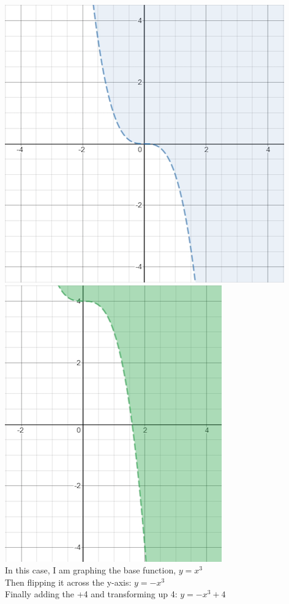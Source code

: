 \documentclass{article}
\begin{document}
	\includegraphics[scale=0.30]{pics/j92v2}  
	\includegraphics[scale=0.30]{pics/j92v3} \\
	In this case, I am graphing the base function, $y=x^3$ \\
	Then flipping it across the y-axis: $y=-x^3$ \\
	Finally adding the +4 and transforming up 4: $y=-x^3+4$ \\ \\
\end{document}
